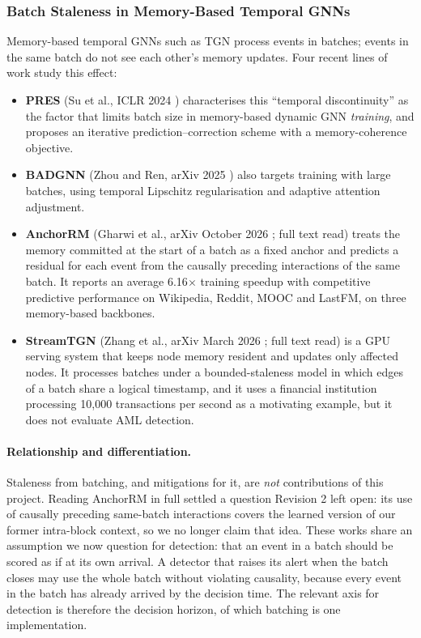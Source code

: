 \documentclass[11pt,a4paper]{article}
\begin{document}
\subsubsection{Batch Staleness in Memory-Based Temporal GNNs}
\label{sec:staleness_work}
Memory-based temporal GNNs such as TGN \cite{rossi2020tgn} process events in batches; events in the same batch do not see each other's memory updates. Four recent lines of work study this effect:
\begin{itemize}[leftmargin=*]
    \item \textbf{PRES} (Su et al., ICLR 2024 \cite{su2024pres}) characterises this ``temporal discontinuity'' as the factor that limits batch size in memory-based dynamic GNN \emph{training}, and proposes an iterative prediction--correction scheme with a memory-coherence objective.
    \item \textbf{BADGNN} (Zhou and Ren, arXiv 2025 \cite{zhou2025badgnn}) also targets training with large batches, using temporal Lipschitz regularisation and adaptive attention adjustment.
    \item \textbf{AnchorRM} (Gharwi et al., arXiv October 2026 \cite{anchorrm2026}; full text read) treats the memory committed at the start of a batch as a fixed anchor and predicts a residual for each event from the causally preceding interactions of the same batch. It reports an average 6.16$\times$ training speedup with competitive predictive performance on Wikipedia, Reddit, MOOC and LastFM, on three memory-based backbones.
    \item \textbf{StreamTGN} (Zhang et al., arXiv March 2026 \cite{streamtgn2026}; full text read) is a GPU serving system that keeps node memory resident and updates only affected nodes. It processes batches under a bounded-staleness model in which edges of a batch share a logical timestamp, and it uses a financial institution processing 10,000 transactions per second as a motivating example, but it does not evaluate AML detection.
\end{itemize}

\paragraph{Relationship and differentiation.} Staleness from batching, and mitigations for it, are \emph{not} contributions of this project. Reading AnchorRM in full settled a question Revision 2 left open: its use of causally preceding same-batch interactions covers the learned version of our former intra-block context, so we no longer claim that idea. These works share an assumption we now question for detection: that an event in a batch should be scored as if at its own arrival. A detector that raises its alert when the batch closes may use the whole batch without violating causality, because every event in the batch has already arrived by the decision time. The relevant axis for detection is therefore the decision horizon, of which batching is one implementation.
\end{document}
